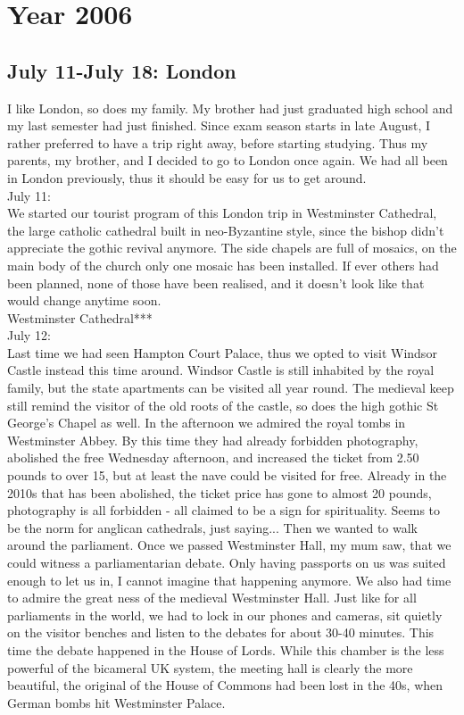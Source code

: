 \chapter{Year 2006}
\label{2006}


\section{July 11-July 18: London}
\label{2006:London}

I like London, so does my family. My brother had just graduated high school and my last semester had just finished. Since exam season starts in late August, I rather preferred to have a trip right away, before starting studying. Thus my parents, my brother, and I decided to go to London once again. We had all been in London previously, thus it should be easy for us to get around.\\

July 11:\\
We started our tourist program of this London trip in Westminster Cathedral, the large catholic cathedral built in neo-Byzantine style, since the bishop didn't appreciate the gothic revival anymore. The side chapels are full of mosaics, on the main body of the church only one mosaic has been installed. If ever others had been planned, none of those have been realised, and it doesn't look like that would change anytime soon.\\

Westminster Cathedral***\\

July 12:\\
Last time we had seen Hampton Court Palace, thus we opted to visit Windsor Castle instead this time around. Windsor Castle is still inhabited by the royal family, but the state apartments can be visited all year round. The medieval keep still remind the visitor of the old roots of the castle, so does the high gothic St George's Chapel as well. In the afternoon we admired the royal tombs in Westminster Abbey. By this time they had already forbidden photography, abolished the free Wednesday afternoon, and increased the ticket from 2.50 pounds to over 15, but at least the nave could be visited for free. Already in the 2010s that has been abolished, the ticket price has gone to almost 20 pounds, photography is all forbidden - all claimed to be a sign for spirituality. Seems to be the norm for anglican cathedrals, just saying... Then we wanted to walk around the parliament. Once we passed Westminster Hall, my mum saw, that we could witness a parliamentarian debate. Only having passports on us was suited enough to let us in, I cannot imagine that happening anymore. We also had time to admire the great ness of the medieval Westminster Hall. Just like for all parliaments in the world, we had to lock in our phones and cameras, sit quietly on the visitor benches and listen to the debates for about 30-40 minutes. This time the debate happened in the House of Lords. While this chamber is the less powerful of the bicameral UK system, the meeting hall is clearly the more beautiful, the original of the House of Commons had been lost in the 40s, when German bombs hit Westminster Palace.\\

